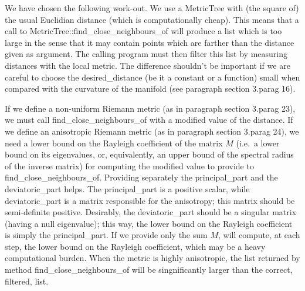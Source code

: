 We have chosen the following work-out.
We use a {\codett MetricTree} with (the square of) the usual Euclidian distance (which is
computationally cheap).
This means that a call to {\codett MetricTree::find\_close\_neighbours\_of} will produce a list
which is too large in the sense that it may contain points which are farther than the
distance given as argument.
The calling program must then filter this list by measuring distances with the local metric.
The difference shouldn't be important if we are careful to choose the {\codett
desired\_distance} (be it a constant or a function) small when compared with the curvature
of the manifold (see paragraph \numb section 3.\numb parag 16).

If we define a non-uniform Riemann metric (as in paragraph \numb section 3.\numb parag 23),
we must call {\codett find\_close\_neighbours\_of} with a modified value of the
distance.
If we define an anisotropic Riemann metric (as in paragraph \numb section 3.\numb parag 24),
we need a lower bound on the Rayleigh coefficient of the matrix $M$ (i.e.\ a lower bound
on its eigenvalues, or, equivalently, an upper bound of the spectral radius of the inverse
matrix) for computing the modified value to provide to {\codett find\_close\_neighbours\_of}.
Providing separately the {\codett principal\_part} and the {\codett deviatoric\_part} helps.
The {\codett principal\_part} is a positive scalar, while {\codett deviatoric\_part} is
a matrix responsible for the anisotropy; this matrix should be semi-definite positive.
Desirably, the {\codett deviatoric\_part} should be a singular matrix (having a null eigenvalue);
this way, the lower bound on the Rayleigh coefficient is simply the {\codett principal\_part}.
If we provide only the sum $M$, {\maniFEM} will compute, at each step, the lower bound on the
Rayleigh coefficient, which may be a heavy computational burden.
When the metric is highly anisotropic, the list returned by method
{\codett find\_close\_neighbours\_of} will be singnificantly larger than the correct, filtered, list.
